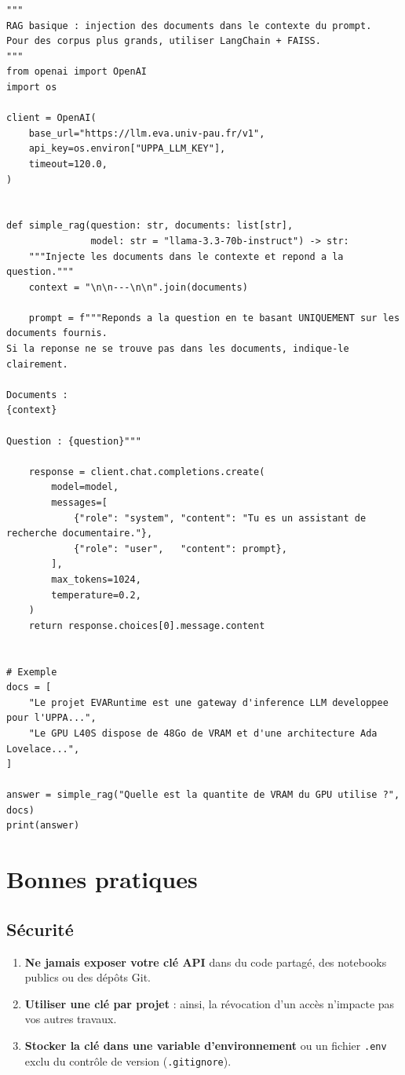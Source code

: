 \documentclass[12pt, a4paper, twoside]{article}
\begin{document}
\begin{lstlisting}[style=pythonstyle, caption={RAG simple sans framework externe}]
"""
RAG basique : injection des documents dans le contexte du prompt.
Pour des corpus plus grands, utiliser LangChain + FAISS.
"""
from openai import OpenAI
import os

client = OpenAI(
    base_url="https://llm.eva.univ-pau.fr/v1",
    api_key=os.environ["UPPA_LLM_KEY"],
    timeout=120.0,
)


def simple_rag(question: str, documents: list[str],
               model: str = "llama-3.3-70b-instruct") -> str:
    """Injecte les documents dans le contexte et repond a la question."""
    context = "\n\n---\n\n".join(documents)

    prompt = f"""Reponds a la question en te basant UNIQUEMENT sur les documents fournis.
Si la reponse ne se trouve pas dans les documents, indique-le clairement.

Documents :
{context}

Question : {question}"""

    response = client.chat.completions.create(
        model=model,
        messages=[
            {"role": "system", "content": "Tu es un assistant de recherche documentaire."},
            {"role": "user",   "content": prompt},
        ],
        max_tokens=1024,
        temperature=0.2,
    )
    return response.choices[0].message.content


# Exemple
docs = [
    "Le projet EVARuntime est une gateway d'inference LLM developpee pour l'UPPA...",
    "Le GPU L40S dispose de 48Go de VRAM et d'une architecture Ada Lovelace...",
]

answer = simple_rag("Quelle est la quantite de VRAM du GPU utilise ?", docs)
print(answer)
\end{lstlisting}

\section{Bonnes pratiques}
\label{sec:bonnes-pratiques}

\subsection{Sécurité}

\begin{enumerate}
  \item \textbf{Ne jamais exposer votre clé API} dans du code partagé, des notebooks publics
        ou des dépôts Git.
  \item \textbf{Utiliser une clé par projet} : ainsi, la révocation d'un accès n'impacte pas
        vos autres travaux.
  \item \textbf{Stocker la clé dans une variable d'environnement} ou un fichier \texttt{.env}
        exclu du contrôle de version (\texttt{.gitignore}).
\end{enumerate}
\end{document}
